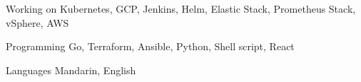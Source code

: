 

\begin{cvskills}

  \cvskill
    {Working on} %
    {Kubernetes, GCP, Jenkins, Helm, Elastic Stack, Prometheus Stack, vSphere, AWS} %

  \cvskill
    {Programming} %
    {Go, Terraform, Ansible, Python, Shell script, React} %

  \cvskill
    {Languages} %
    {Mandarin, English} %

\end{cvskills}
